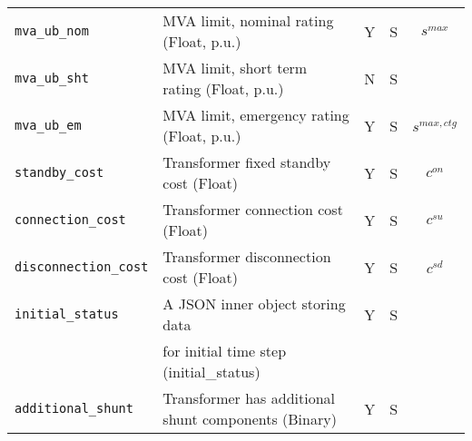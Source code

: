 \documentclass{article}
\begin{document}
\begin{center}
\begin{tabular}{ l | l | c | c | c |}
  {\tt mva\_ub\_nom} & MVA limit, nominal rating (Float, p.u.) & Y & S & $s^{max}$ \\
  {\tt mva\_ub\_sht} & MVA limit, short term rating (Float, p.u.) & N & S &  \\
  {\tt mva\_ub\_em} & MVA limit, emergency rating (Float, p.u.) & Y & S & $s^{max,ctg}$ \\

  {\tt standby\_cost} & Transformer fixed standby cost (Float) & Y & S & $c^{on}$\\
  {\tt connection\_cost} &  Transformer connection cost (Float) & Y & S & $c^{su}$\\
  {\tt disconnection\_cost} & Transformer disconnection cost (Float) & Y & S & $c^{sd}$\\
  {\tt initial\_status} & A JSON inner object storing data  & Y & S &  \\
       & for initial time step (initial\_status) &  &  &  \\
  {\tt additional\_shunt} & Transformer has additional shunt components (Binary)& Y & S & \\
  \hline
\end{tabular}
\end{center}
  
  
  
\end{document}
